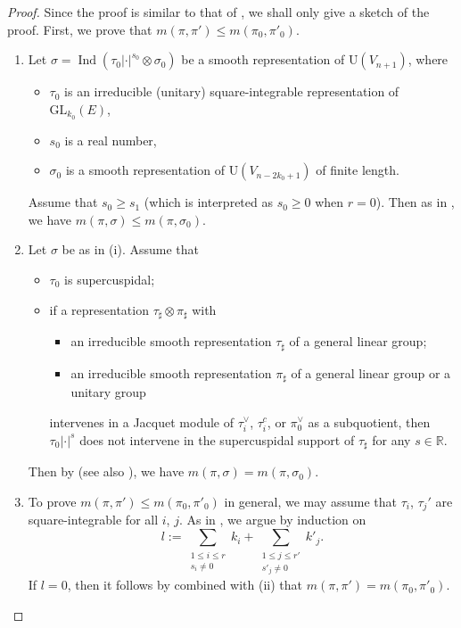 \documentclass[11pt]{amsart}
\numberwithin{equation}{section}
\theoremstyle{plain}
\theoremstyle{definition}
\theoremstyle{remark}
\def\Ind{\operatorname{Ind}}
\def\GL{\mathrm{GL}}
\def\U{\mathrm{U}}
\def\RR{\mathbb{R}}
\begin{document}
\begin{proof}
Since the proof is similar to that of \cite[Proposition 1.3]{mw}, we shall only give a sketch of the proof.
First, we prove that $m(\pi, \pi') \le m(\pi_0, \pi'_0)$.
\begin{enumerate}
 \item Let $\sigma = \Ind(\tau_0 |\cdot|^{s_0} \otimes \sigma_0)$ be a smooth representation of $\U(V_{n+1})$, where
\begin{itemize}
 \item $\tau_0$ is an irreducible (unitary) square-integrable representation of $\GL_{k_0}(E)$,
 \item $s_0$ is a real number, 
 \item $\sigma_0$ is a smooth representation of $\U(V_{n-2k_0+1})$ of finite length.
\end{itemize}
Assume that $s_0 \ge s_1$ (which is interpreted as $s_0 \ge 0$ when $r=0$).
Then as in \cite[Lemme 1.4]{mw}, we have $m(\pi, \sigma) \le m(\pi, \sigma_0)$.
\item Let $\sigma$ be as in (i).
Assume that
\begin{itemize}
 \item $\tau_0$ is supercuspidal;
 \item if a representation $\tau_\sharp \otimes \pi_\sharp$ with
\begin{itemize}
 \item an irreducible smooth representation $\tau_\sharp$ of a general linear group;
 \item an irreducible smooth representation $\pi_\sharp$ of a general linear group or a unitary group
\end{itemize}
intervenes in a Jacquet module of $\tau_i^\vee$, $\tau_i^c$, or $\pi_0^\vee$ as a subquotient, then $\tau_0 |\cdot|^s$ does not intervene in the supercuspidal support of $\tau_\sharp$ for any $s \in \RR$.
\end{itemize}
Then by \cite[Theorem 15.1]{ggp1} (see also \cite[Lemme 1.5]{mw}), we have $m(\pi, \sigma) = m(\pi, \sigma_0)$.
\item To prove $m(\pi, \pi') \le m(\pi_0, \pi'_0)$ in general, we may assume that $\tau_i$, $\tau_j'$ are square-integrable for all $i$, $j$.
As in \cite[\S 1.6]{mw}, we argue by induction on
\[
 l := \sum_{\substack{1 \le i \le r \\ s_i \ne 0}} k_i + \sum_{\substack{1 \le j \le r' \\ s'_j \ne 0}} k'_j.
\]
If $l=0$, then it follows by \cite[\S\S 14--15]{bp3} combined with (ii) that $m(\pi, \pi') = m(\pi_0, \pi'_0)$.

\end{enumerate}
\end{proof}
\end{document}
